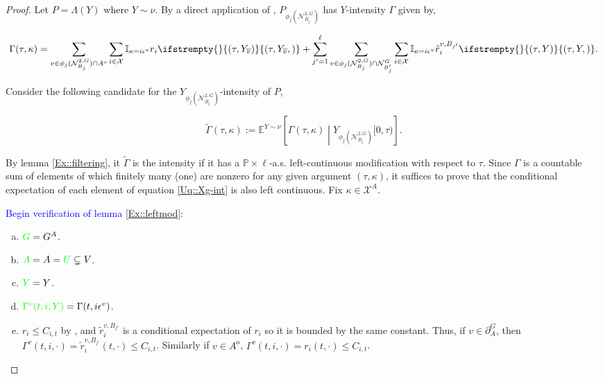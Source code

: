 \documentclass[12pt]{article}
\newcommand{\skipLine}{\vspace{12pt}}
\newcommand{\mb}{\mathbb}
\newcommand{\mc}{\mathcal}
\newcommand{\ov}{\overline}
\newcommand{\ep}{\epsilon}
\newcommand{\tb}{\textcolor{blue}}
\newcommand{\tg}{\textcolor{green}}
\newcommand{\pr}{\mb{P}}							%
\newcommand{\exmu}[2]{\mb{E}^{#1}\left[#2\right]}	%
\newcommand{\defeq}{:=}								%
\newcommand{\sta}{\mc{X}}							%
\newcommand{\gneigh}[2]{\mc{N}^{#1}_{#2}}			%
\newcommand{\dgneigh}[2]{\mc{N}^{2,#1}_{#2}}		%
\newcommand{\cl}[1]{\ov{#1}}						%
\newcommand{\gbdry}[2]{\partial^{#1}_{#2}}			%
\newcommand{\Sm}{\ell}								%
\newcommand{\rate}{r}								%
\newcommand{\vind}[1]{_{#1}}						%
\newcommand{\tmi}[1]{#1}							%
\newcommand{\vpara}[1]{^{#1}}						%
\newcommand{\stpara}[1]{_{#1}}						%
\newcommand{\psize}{\ell}							%
\newcommand{\jumpibd}[2]{C_{#1,#2}}					%
\newcommand{\tmepro}[3]{
\ifstrempty{#3}{
	\left(#1,#2\right)}{
	\left(#1,#2,#3\right)}}							%
\newcommand{\Xg}{Y}									%
\newcommand{\brate}{\alt{\rate}}					%
\newcommand{\inte}[1]{{#1}^\mathrm{o}}				%
\newcommand{\alt}[1]{\tilde{#1}}					%
\newcommand{\pmap}{\Lambda}							%
\newcommand{\rt}{\tau}								%
\renewcommand{\mark}{\kappa}						%
\newcommand{\ratee}{\Gamma}							%
\newcommand{\cratee}{\alt{\ratee}}					%
\newcommand{\rp}{P}									%
\newcommand{\mm}{\nu}								%
\newcommand{\ev}[1]{\ep^{#1}}						%
\newcommand{\vjpara}[2]{^{#1,#2}}					%
\begin{document}
\begin{proof}

Let \(\rp = \pmap(\Xg)\) where \(\Xg \sim \mm\). By a direct application of \cite[Exercise 14.7.1]{DalVer08}, \(\rp\vind{\phi_j(\dgneigh{G}{B_j})}\) has \(\Xg\)-intensity \(\ratee\) given by,

\begin{equation}
\ratee(\rt,\mark) = \sum_{v \in\phi_j(\dgneigh{G}{B_j})\cap\inte{A}} \sum_{i \in \sta} \mb{I}_{\mark = i\ev{v}} \rate\stpara{i}\tmepro{\rt}{\Xg\vind{\cl{v}}}{} + \sum_{j' = 1}^\psize\sum_{v \in \phi_j(\dgneigh{G}{B_j})\cap\gneigh{G}{B_j'}}\sum_{i\in \sta} \mb{I}_{\mark = i\ev{v}} \brate\vjpara{v}{B_{j'}}\stpara{i}\tmepro{\rt}{\Xg}{}.
\label{Uq::Xg-int}
\end{equation}

Consider the following candidate for the \(\Xg\vind{\phi_j(\dgneigh{G}{B_j})}\)-intensity of \(\rp\), 

\[\cratee(\rt,\mark) \defeq \exmu{\Xg \sim \mm}{\ratee(\rt,\mark)\middle|\Xg\vind{\phi_j(\dgneigh{G}{B_j})}\tmi{[0,\rt)}}.\]

By lemma \ref{Ex::filtering}, it \(\cratee\) is the intensity if it has a \(\pr\times\Sm\)-a.s. left-continuous modification with respect to \(\rt\). Since \(\ratee\) is a countable sum of elements of which finitely many (one) are nonzero for any given argument \((\rt,\mark)\), it suffices to prove that the conditional expectation of each element of equation \eqref{Uq::Xg-int} is also left continuous. Fix \(\mark \in \sta^A\).

\skipLine

\tb{Begin verification of lemma \ref{Ex::leftmod}:}

\skipLine

\begin{enumerate}[(a)]
\item \(\tg{G} = G\vpara{A}\).

\item \(\tg{A} = A = \tg{U} \subsetneq V\).

\item \(\tg{\Xg} = \Xg\).

\item \(\tg{\ratee\vpara{v}(t,i,\Xg)} = \ratee(t,i\ev{v})\).

\item \(\rate\stpara{i} \leq \jumpibd{i}{t}\) by \cite[assumption \ref{F-a::bddr}]{F}, and \(\brate\vjpara{v}{B_{j'}}\stpara{i}\) is a conditional expectation of \(\rate\stpara{i}\) so it is bounded by the same constant. Thus, if \(v \in \gbdry{G}{A}\), then \(\ratee\vpara{v}(t,i,\cdot) = \brate\vjpara{v}{B_{j'}}\stpara{i}(t,\cdot) \leq \jumpibd{i}{t}\). Similarly if \(v \in \inte{A}\), \(\ratee\vpara{v}(t,i,\cdot) = \rate\stpara{i}(t,\cdot) \leq \jumpibd{i}{t}\).


\end{enumerate}
\end{proof}
\end{document}
